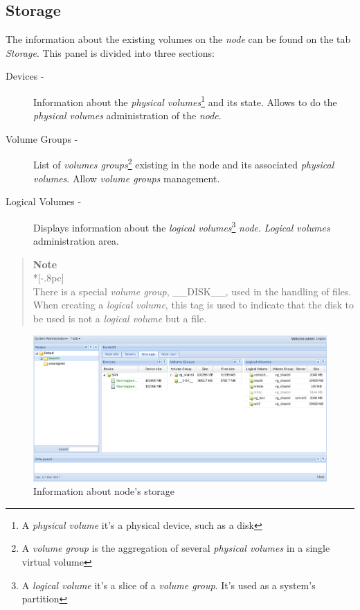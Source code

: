 \subsection{Storage}
\label{sec:storage}

The information about the existing volumes on the \emph{node} can be found on the tab \emph{Storage}.
This panel is divided into three sections:

\begin{description}
	\item[Devices -] Information about the \emph{physical volumes}\footnote{A \emph{physical volume} it's a physical device, such as a disk} and its state. Allows to do the \emph{physical volumes} administration of the \emph{node}.
	\item[Volume Groups -] List of \emph{volumes groups}\footnote{A \emph{volume group} is the aggregation of several \emph{physical volumes} in a single virtual volume} existing in the node and its associated \emph{physical volumes}. Allow \emph{volume groups} management.
	\item[Logical Volumes -] Displays information about the \emph{logical volumes}\footnote{A \emph{logical volume} it's a slice of a \emph{volume group}. It's used as a system's partition} \emph{node}. \emph{Logical volumes} administration area.
\end{description}


\begin{quote}
	{\large \bf Note} \\*[-.8pc]
	\underline{\hspace{6in}} \\
There is a special \emph{volume group}, \_\_DISK\_\_, used in the handling of files. When creating a \emph{logical volume}, this tag is used to indicate that the disk to be used is not a \emph{logical volume} but a file.
\end{quote}


\begin{figure}[H]
	\begin{center}
	\includegraphics[scale=0.45]{screenshots/node_storage.png}
	\caption{Information about node's storage}
	\label{fig:inicial}
	\end{center}
\end{figure}

